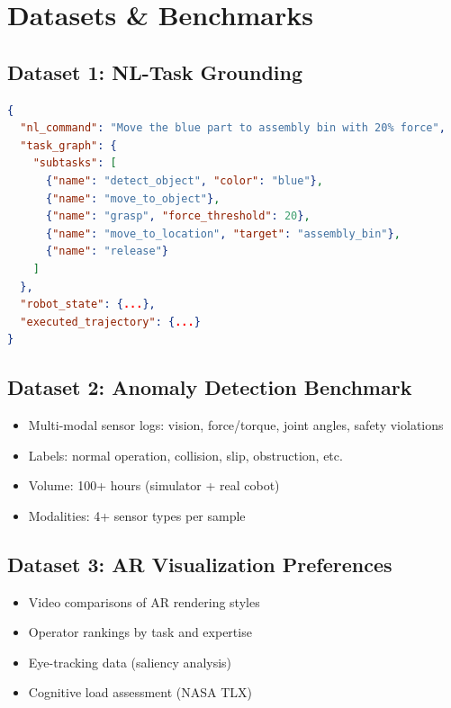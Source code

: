 \documentclass[12pt,a4paper,oneside]{book}
\begin{document}
\newpage

\chapter{Datasets \& Benchmarks}

\section{Dataset 1: NL-Task Grounding}

\begin{lstlisting}[language=json, caption=Example NL-Task Pair]
{
  "nl_command": "Move the blue part to assembly bin with 20% force",
  "task_graph": {
    "subtasks": [
      {"name": "detect_object", "color": "blue"},
      {"name": "move_to_object"},
      {"name": "grasp", "force_threshold": 20},
      {"name": "move_to_location", "target": "assembly_bin"},
      {"name": "release"}
    ]
  },
  "robot_state": {...},
  "executed_trajectory": {...}
}
\end{lstlisting}

\section{Dataset 2: Anomaly Detection Benchmark}

\begin{itemize}
    \item Multi-modal sensor logs: vision, force/torque, joint angles, safety violations
    \item Labels: normal operation, collision, slip, obstruction, etc.
    \item Volume: 100+ hours (simulator + real cobot)
    \item Modalities: 4+ sensor types per sample
\end{itemize}

\section{Dataset 3: AR Visualization Preferences}

\begin{itemize}
    \item Video comparisons of AR rendering styles
    \item Operator rankings by task and expertise
    \item Eye-tracking data (saliency analysis)
    \item Cognitive load assessment (NASA TLX)
\end{itemize}
\end{document}
